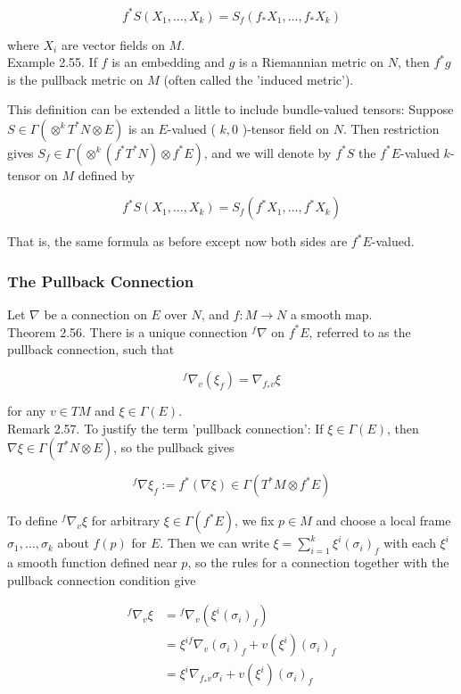 \documentclass[10pt, letterpaper]{article}
\begin{document}
$$
f^{*} S\left(X_{1}, \ldots, X_{k}\right)=S_{f}\left(f_{*} X_{1}, \ldots, f_{*} X_{k}\right)
$$

where $X_{i}$ are vector fields on $M$.\\
Example 2.55. If $f$ is an embedding and $g$ is a Riemannian metric on $N$, then $f^{*} g$ is the pullback metric on $M$ (often called the 'induced metric').

This definition can be extended a little to include bundle-valued tensors: Suppose $S \in \Gamma\left(\otimes^{k} T^{*} N \otimes E\right)$ is an $E$-valued ( $k, 0$ )-tensor field on $N$. Then restriction gives $S_{f} \in \Gamma\left(\otimes^{k}\left(f^{*} T^{*} N\right) \otimes f^{*} E\right)$, and we will denote by $f^{*} S$ the $f^{*} E$-valued $k$-tensor on $M$ defined by

$$
f^{*} S\left(X_{1}, \ldots, X_{k}\right)=S_{f}\left(f^{*} X_{1}, \ldots, f^{*} X_{k}\right)
$$

That is, the same formula as before except now both sides are $f^{*} E$-valued.

\subsubsection*{The Pullback Connection}
Let $\nabla$ be a connection on $E$ over $N$, and $f: M \rightarrow N$ a smooth map.\\
Theorem 2.56. There is a unique connection ${ }^{f} \nabla$ on $f^{*} E$, referred to as the pullback connection, such that

$$
{ }^{f} \nabla_{v}\left(\xi_{f}\right)=\nabla_{f_{*} v} \xi
$$

for any $v \in T M$ and $\xi \in \Gamma(E)$.\\
Remark 2.57. To justify the term 'pullback connection': If $\xi \in \Gamma(E)$, then $\nabla \xi \in \Gamma\left(T^{*} N \otimes E\right)$, so the pullback gives

$$
{ }^{f} \nabla \xi_{f}:=f^{*}(\nabla \xi) \in \Gamma\left(T^{*} M \otimes f^{*} E\right)
$$

To define ${ }^{f} \nabla_{v} \xi$ for arbitrary $\xi \in \Gamma\left(f^{*} E\right)$, we fix $p \in M$ and choose a local frame $\sigma_{1}, \ldots, \sigma_{k}$ about $f(p)$ for $E$. Then we can write $\xi=\sum_{i=1}^{k} \xi^{i}\left(\sigma_{i}\right)_{f}$ with each $\xi^{i}$ a smooth function defined near $p$, so the rules for a connection together with the pullback connection condition give

$$
\begin{aligned}
{ }^{f} \nabla_{v} \xi & ={ }^{f} \nabla_{v}\left(\xi^{i}\left(\sigma_{i}\right)_{f}\right) \\
& =\xi^{i f} \nabla_{v}\left(\sigma_{i}\right)_{f}+v\left(\xi^{i}\right)\left(\sigma_{i}\right)_{f} \\
& =\xi^{i} \nabla_{f_{*} v} \sigma_{i}+v\left(\xi^{i}\right)\left(\sigma_{i}\right)_{f}
\end{aligned}
$$
\end{document}

